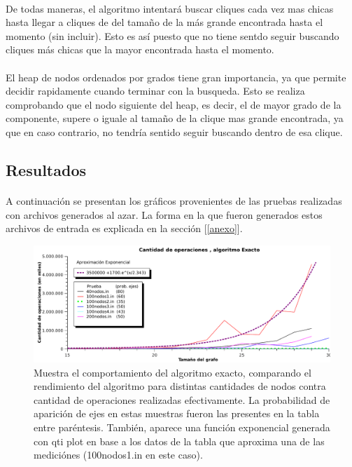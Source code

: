 \paragraph{}
De todas maneras, el algoritmo intentará buscar cliques cada vez mas chicas hasta llegar a cliques de del tamaño de la más grande encontrada hasta el momento (sin incluir). Esto es así puesto que no tiene sentdo seguir buscando cliques más chicas que la mayor encontrada hasta el momento. 

\paragraph{}
El heap de nodos ordenados por grados tiene gran importancia, ya que permite decidir rapidamente cuando terminar con la busqueda. Esto se realiza comprobando que el nodo siguiente del heap, es decir, el de mayor grado de la componente, supere o iguale al tamaño de la clique mas grande encontrada, ya que en caso contrario, no tendría sentido seguir buscando dentro de esa clique.


\subsection{Resultados}

\paragraph{}
A continuación se presentan los gráficos provenientes de las pruebas realizadas con archivos generados al azar. La forma en la que fueron generados estos archivos de entrada es explicada en la sección [\ref{anexo}].
\begin{figure}[h]
    \begin{minipage}{\textwidth}
	\begin{center}
		\includegraphics[width=\textwidth]{./otros/graficos/operaciones_ej2.pdf}
		\caption{Muestra el comportamiento del algoritmo exacto, comparando el rendimiento del algoritmo para distintas cantidades de nodos contra cantidad de operaciones realizadas efectivamente. La probabilidad de aparición de ejes en estas muestras fueron las presentes en la tabla entre paréntesis. También, aparece una función exponencial generada con qti plot en base a los datos de la tabla que aproxima una de las mediciónes (100nodos1.in en este caso).}
		\label{ej2contarOp}
	\end{center}
    \end{minipage}

\end{figure}


